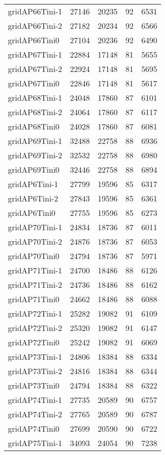 \begin{longtable}{lrrrr}
gridAP66Tini-1 & 27146 & 20235 & 92 & 6531 \\
gridAP66Tini-2 & 27182 & 20234 & 92 & 6566 \\
gridAP66Tini0 & 27104 & 20236 & 92 & 6490 \\
gridAP67Tini-1 & 22884 & 17148 & 81 & 5655 \\
gridAP67Tini-2 & 22924 & 17148 & 81 & 5695 \\
gridAP67Tini0 & 22846 & 17148 & 81 & 5617 \\
gridAP68Tini-1 & 24048 & 17860 & 87 & 6101 \\
gridAP68Tini-2 & 24064 & 17860 & 87 & 6117 \\
gridAP68Tini0 & 24028 & 17860 & 87 & 6081 \\
gridAP69Tini-1 & 32488 & 22758 & 88 & 6936 \\
gridAP69Tini-2 & 32532 & 22758 & 88 & 6980 \\
gridAP69Tini0 & 32446 & 22758 & 88 & 6894 \\
gridAP6Tini-1 & 27799 & 19596 & 85 & 6317 \\
gridAP6Tini-2 & 27843 & 19596 & 85 & 6361 \\
gridAP6Tini0 & 27755 & 19596 & 85 & 6273 \\
gridAP70Tini-1 & 24834 & 18736 & 87 & 6011 \\
gridAP70Tini-2 & 24876 & 18736 & 87 & 6053 \\
gridAP70Tini0 & 24794 & 18736 & 87 & 5971 \\
gridAP71Tini-1 & 24700 & 18486 & 88 & 6126 \\
gridAP71Tini-2 & 24736 & 18486 & 88 & 6162 \\
gridAP71Tini0 & 24662 & 18486 & 88 & 6088 \\
gridAP72Tini-1 & 25282 & 19082 & 91 & 6109 \\
gridAP72Tini-2 & 25320 & 19082 & 91 & 6147 \\
gridAP72Tini0 & 25242 & 19082 & 91 & 6069 \\
gridAP73Tini-1 & 24806 & 18384 & 88 & 6334 \\
gridAP73Tini-2 & 24816 & 18384 & 88 & 6344 \\
gridAP73Tini0 & 24794 & 18384 & 88 & 6322 \\
gridAP74Tini-1 & 27735 & 20589 & 90 & 6757 \\
gridAP74Tini-2 & 27765 & 20589 & 90 & 6787 \\
gridAP74Tini0 & 27699 & 20590 & 90 & 6722 \\
gridAP75Tini-1 & 34093 & 24054 & 90 & 7238 \\

\end{longtable}
